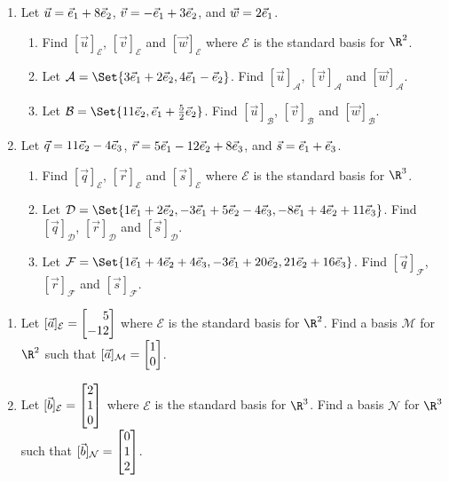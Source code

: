 \begin{exercises}
	\begin{problist}

		\prob
		\begin{enumerate}

			\item Let $\vec u={\vec e_1}+8{\vec e_2}$, $\vec v=-{\vec e_1}+ 3{\vec e_2}$, and $\vec w=2{\vec e_1}$.

			\begin{enumerate}
				\item Find $[\vec u]_{\mathcal E}$, $[\vec v]_{\mathcal E}$ and
				$[\vec w]_{\mathcal E}$ where $\mathcal E$ is the standard basis for $\R^2$.
				\item Let $\mathcal A=\Set{3\xhat+2\yhat,4\xhat-\yhat}$.
				Find $[\vec u]_{\mathcal A}$, $[\vec v]_{\mathcal A}$ and
				$[\vec w]_{\mathcal A}$.
				\item Let $\mathcal B=\Set{11\yhat,\xhat+\frac{5}{2}\yhat}$.
				Find $[\vec u]_{\mathcal B}$, $[\vec v]_{\mathcal B}$ and
				$[\vec w]_{\mathcal B}$.
			\end{enumerate}

			\item Let $\vec q=11{\vec e_2}-4{\vec e_3}$, $\vec r=5{\vec e_1}-12{\vec e_2}+8{\vec e_3}$, and $\vec s={\vec e_1}+{\vec e_3}$.

			\begin{enumerate}
				\item Find $[\vec q]_{\mathcal E}$, $[\vec r]_{\mathcal E}$ and
				$[\vec s]_{\mathcal E}$ where $\mathcal E$ is the standard basis for $\R^3$.
				\item Let $\mathcal D=\Set{1\xhat+2\yhat,-3\xhat+5\yhat-4\zhat,-8\xhat+4\yhat+11\zhat}$.
				Find $[\vec q]_{\mathcal D}$, $[\vec r]_{\mathcal D}$ and
				$[\vec s]_{\mathcal D}$.
				\item Let $\mathcal F=\Set{1\xhat+4\yhat+4\zhat,-3\xhat+20\yhat,21\yhat+16\zhat}$.
				Find $[\vec q]_{\mathcal F}$, $[\vec r]_{\mathcal F}$ and
				$[\vec s]_{\mathcal F}$.
			\end{enumerate}
		\end{enumerate}

		\prob
		\begin{enumerate}
			\item Let $[\vec a]_{\mathcal E}=\mat{5\\-12}$ where $\mathcal E$ is the standard basis
			for $\R^2$. Find a basis $\mathcal M$ for $\R^2$ such that $[\vec a]_{\mathcal M}=\mat{1\\0}$.
			\item Let $[\vec b]_{\mathcal E}=\mat{2\\1\\0}$ where $\mathcal E$ is the standard basis
			for $\R^3$. Find a basis $\mathcal N$ for $\R^3$ such that $[\vec b]_{\mathcal N}=\mat{0\\1\\2}$.
		\end{enumerate}


\end{problist}
\end{exercises}
